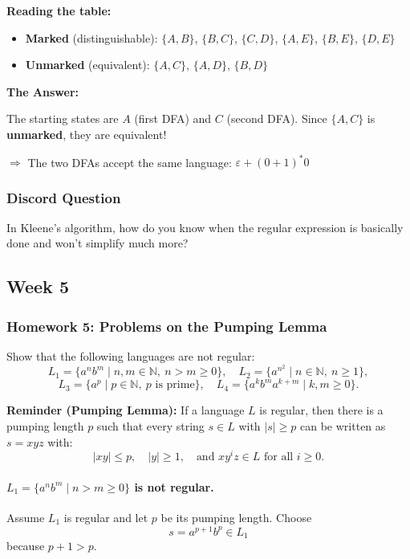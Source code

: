 \documentclass{article}
\theoremstyle{theorem}
\theoremstyle{definition}
\theoremstyle{remark}
\begin{document}
\textbf{Reading the table:}
\begin{itemize}
  \item \textbf{Marked} (distinguishable): $\{A,B\}$, $\{B,C\}$, $\{C,D\}$, $\{A,E\}$, $\{B,E\}$, $\{D,E\}$
  \item \textbf{Unmarked} (equivalent): $\{A,C\}$, $\{A,D\}$, $\{B,D\}$
\end{itemize}

\textbf{The Answer:}

The starting states are $A$ (first DFA) and $C$ (second DFA). Since $\{A,C\}$ is \textbf{unmarked}, they are equivalent!

$\Rightarrow$ The two DFAs accept the same language: $\varepsilon + (0+1)^*0$

\subsubsection{Discord Question}

In Kleene’s algorithm, how do you know when the regular expression is basically done and won’t simplify much more?

\subsection{Week 5}

\subsubsection{Homework 5: Problems on the Pumping Lemma}

Show that the following languages are not regular:
\[
L_1=\{a^n b^m\mid n,m\in\mathbb{N},\ n>m\ge 0\},\quad
L_2=\{a^{n^2}\mid n\in\mathbb{N},\ n\ge 1\},
\]
\[
L_3=\{a^p\mid p\in\mathbb{N},\ p\text{ is prime}\},\quad
L_4=\{a^k b^m a^{k+m}\mid k,m\ge 0\}.
\]

\textbf{Reminder (Pumping Lemma):} If a language $L$ is regular, then there is a pumping length $p$ such that every string $s\in L$ with $|s|\ge p$ can be written as $s=xyz$ with:
\[
|xy|\le p,\quad |y|\ge 1,\quad \text{and }xy^iz\in L\text{ for all }i\ge 0.
\]

\paragraph{$L_1=\{a^n b^m\mid n>m\ge 0\}$ is not regular.}
Assume $L_1$ is regular and let $p$ be its pumping length.
Choose
\[
s=a^{p+1}b^p\in L_1
\]
because $p+1>p$.
\end{document}
